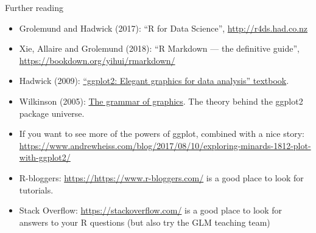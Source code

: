 \documentclass[
  ignorenonframetext,
]{beamer}
\begin{document}
\begin{frame}{Further reading}
\protect\hypertarget{further-reading}{}
\begin{itemize}
\item
  Grolemund and Hadwick (2017): ``R for Data Science'',
  \url{http://r4ds.had.co.nz}
\item
  Xie, Allaire and Grolemund (2018): ``R Markdown --- the definitive
  guide'', \url{https://bookdown.org/yihui/rmarkdown/}
\item
  Hadwick (2009):
  \href{https://link.springer.com/book/10.1007\%2F978-0-387-98141-3}{``ggplot2:
  Elegant graphics for data analysis'' textbook}.
\item
  Wilkinson (2005):
  \href{https://www.springer.com/gp/book/9780387245447}{The grammar of
  graphics}. The theory behind the ggplot2 package universe.
\item
  If you want to see more of the powers of ggplot, combined with a nice
  story:
  \url{https://www.andrewheiss.com/blog/2017/08/10/exploring-minards-1812-plot-with-ggplot2/}
\item
  R-bloggers: \url{https://https://www.r-bloggers.com/} is a good place
  to look for tutorials.
\item
  Stack Overflow: \url{https://stackoverflow.com/} is a good place to
  look for answers to your R questions (but also try the GLM teaching
  team)
\end{itemize}
\end{frame}
\end{document}
